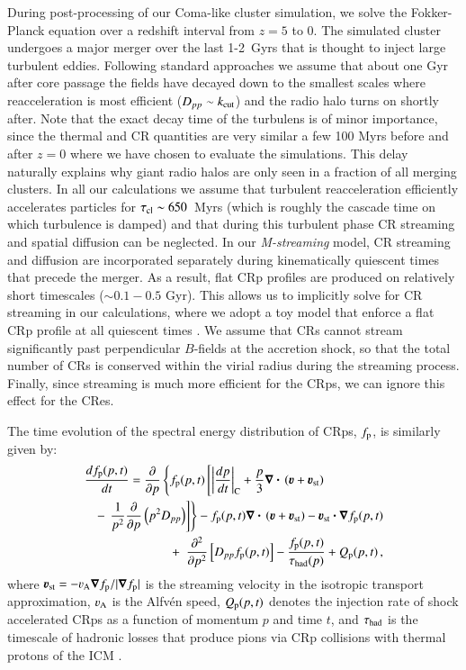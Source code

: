 \documentclass[fleqn,usenatbib,useAMS]{mnras}
\newcommand{\bcdot}{\ensuremath{%
  \mathchoice%
   {\mskip\thinmuskip\lower0.2ex\hbox{\scalebox{1.5}{$\cdot$}}\mskip\thinmuskip}}%
   {\mskip\thinmuskip\lower0.2ex\hbox{\scalebox{1.5}{$\cdot$}}\mskip\thinmuskip}%
   {\lower0.3ex\hbox{\scalebox{1.2}{$\cdot$}}}%
   {\lower0.3ex\hbox{\scalebox{1.2}{$\cdot$}}}%
}
\newcommand{\Mstream}{{\it M-streaming}\xspace}
\newcommand{\bvel}{\ensuremath{\boldsymbol{\varv}}}
\newcommand{\bnabla}{\ensuremath{\boldsymbol{\nabla}}}
\begin{document}
During post-processing of our Coma-like cluster simulation, we solve
the Fokker-Planck equation over a redshift interval from $z=5$ to
0. The simulated cluster undergoes a major merger over the last
1-2~Gyrs that is thought to inject large turbulent eddies. Following
standard approaches
\citep{brunetti07,brunetti11,2004ApJ...614..757Y,2015ApJ...800...60M}
we assume that about one Gyr after core passage the fields have
decayed down to the smallest scales where reacceleration is most
efficient ($D_{pp}\sim k_{\mathrm{cut}}$) and the radio halo turns on
shortly after. Note that the exact decay time of the turbulens is of
minor importance, since the thermal and CR quantities are very similar
a few 100 Myrs before and after $z=0$ where we have chosen to evaluate
the simulations. This delay naturally explains why giant radio halos
are only seen in a fraction of all merging clusters. In all our
calculations we assume that turbulent reacceleration efficiently
accelerates particles for $\tau_{\mathrm{cl}}\sim650$~Myrs (which is
roughly the cascade time on which turbulence is damped) and that
during this turbulent phase CR streaming and spatial diffusion can be
neglected. In our \Mstream model, CR streaming and diffusion are
incorporated separately during kinematically quiescent times that
precede the merger. As a result, flat CRp profiles are produced on
relatively short timescales ($\sim 0.1-0.5$ Gyr). This allows us to
implicitly solve for CR streaming in our calculations, where we adopt
a toy model that enforce a flat CRp profile at all quiescent times
\citep{wiener13}. We assume that CRs cannot stream significantly past
perpendicular $B$-fields at the accretion shock, so that the total
number of CRs is conserved within the virial radius during the
streaming process. Finally, since streaming is much more efficient for
the CRps, we can ignore this effect for the CRes.

The time evolution of the spectral energy distribution of CRps,
$f_{{\mathrm{p}}}$, is similarly given by:
\begin{eqnarray}
\lefteqn{
  {{d f_{\rmn{p}}(p,t)}\over{d t}} =
  {{\partial }\over{\partial p}}
  \left\{
  f_{\rmn{p}}(p,t)\left[ \left|{{dp}\over{dt}}\right|_{\rm C}
    + \frac{p}{3}\bnabla\bcdot \left(\bvel+\bvel_{\rmn{st}}\right)\right.\right.}
\nonumber\\
&&-\left.\left. {1\over{p^2}}{{\partial }\over{\partial p}}\left(p^2 D_{pp}\right)
\right]\right\} - f_{\rmn{p}}(p,t) \bnabla\bcdot \left(\bvel+\bvel_{\rmn{st}}\right) 
- \bvel_{\rmn{st}}\bcdot\bnabla f_{\rmn{p}}(p,t)
\nonumber\\
&&+\,\,\, {{\partial^2 }\over{\partial p^2}}
\left[ D_{pp} f_{\rmn{p}}(p,t) \right] - {{f_{\rmn{p}}(p,t)}\over{\tau_{\rm had}(p)}}
+ Q_{\rmn{p}}(p,t)\, ,
\label{eq:FP_p}
\end{eqnarray}
where $\bvel_{\rmn{st}}=-\varv_{\rmn{A}}\bnabla f_{\rmn{p}}/|\bnabla
f_{\rmn{p}}|$ is the streaming velocity in the isotropic transport
approximation, $\varv_{\rmn{A}}$ is the Alfv\'en speed,
$Q_{{\mathrm{p}}}(p,t)$ denotes the injection rate of shock accelerated
CRps as a function of momentum $p$ and time $t$, and $\tau_{\rm had}$
is the timescale of hadronic losses that produce pions via CRp
collisions with thermal protons of the ICM \cite[e.g.][]{brunetti11}.
\end{document}
